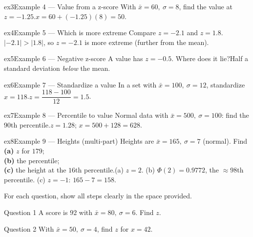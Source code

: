 \documentclass[11pt]{article}
\begin{document}
\begin{example}{ex3}{Example 4 --- Value from a z-score}
With $\bar x=60,\ \sigma=8$, find the value at $z=-1.25$.\soln $x=60+(-1.25)(8)=50$.
\end{example}

\begin{example}{ex4}{Example 5 --- Which is more extreme}
Compare $z=-2.1$ and $z=1.8$.\soln $|-2.1|>|1.8|$, so $z=-2.1$ is more extreme (further from the mean).
\end{example}

\begin{example}{ex5}{Example 6 --- Negative z-score}
A value has $z=-0.5$. Where does it lie?\soln Half a standard deviation \emph{below} the mean.
\end{example}

\begin{example}{ex6}{Example 7 --- Standardize a value}
In a set with $\bar x=100,\ \sigma=12$, standardize $x=118$.\soln $z=\dfrac{118-100}{12}=1.5$.
\end{example}

\begin{example}{ex7}{Example 8 --- Percentile to value}
Normal data with $\bar x=500,\ \sigma=100$: find the $90$th percentile.\soln $z=1.28$; $x=500+128=628$.
\end{example}

\begin{example}{ex8}{Example 9 --- Heights (multi-part)}
Heights are $\bar x=165,\ \sigma=7$ (normal). Find \\ \textbf{(a)} $z$ for $179$; \\ \textbf{(b)} the percentile; \\ \textbf{(c)} the height at the $16$th percentile.\soln (a) $z=2$. (b) $\Phi(2)=0.9772$, the $\approx98$th percentile. (c) $z=-1$: $165-7=158$.
\end{example}

\clearpage
{}
For each question, show all steps clearly in the space provided.

\begin{qbox}{Question 1}
A score is $92$ with $\bar x=80,\ \sigma=6$. Find $z$.\workspace{2.4cm}
\end{qbox}

\begin{qbox}{Question 2}
With $\bar x=50,\ \sigma=4$, find $z$ for $x=42$.\workspace{2.4cm}
\end{qbox}
\end{document}
